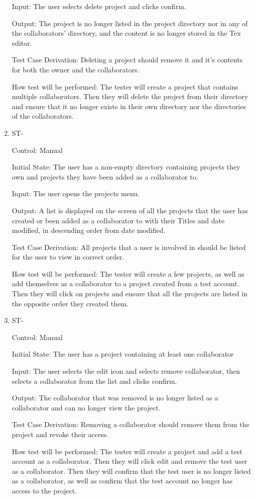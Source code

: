 \documentclass[12pt, titlepage]{article}
\newcounter{TESTID}
\newcommand\TESTNUM{\stepcounter{TESTID}\theTESTID}
\begin{document}
\begin{enumerate}
		Input: The user selects delete project and clicks confirm.
		
		Output: The project is no longer listed in the project directory nor in any of the collaborators' directory, and the content is no longer stored in the Tex editor.
		
		Test Case Derivation: Deleting a project should remove it and it's contents for both the owner and the collaborators.
		
		How test will be performed: The tester will create a project that contains multiple collaborators. Then they will delete the project from their directory and ensure that it no longer exists in their own directory nor the directories of the collaborators.
		
		\item{ST-\TESTNUM\\}
		
		Control: Manual
		
		Initial State: The user has a non-empty directory containing projects they own and projects they have been added as a collaborator to.
		
		Input: The user opens the projects menu. 
		
		Output: A list is displayed on the screen of all the projects that the user has created or been added as a collaborator to with their Titles and date modified, in descending order from date modified.
		
		Test Case Derivation: All projects that a user is involved in should be listed for the user to view in correct order.
		
		How test will be performed: The tester will create a few projects, as well as add themselves as a collaborator to a project created from a test account. Then they will click on projects and ensure that all the projects are listed in the opposite order they created them.
		
		\item{ST-\TESTNUM\\}
		
		Control: Manual
		
		Initial State: The user has a project containing at least one collaborator
		
		Input: The user selects the edit icon and selects remove collaborator, then selects a collaborator from the list and clicks confirm. 
		
		Output: The collaborator that was removed is no longer listed as a collaborator and can no longer view the project.
		
		Test Case Derivation: Removing a collaborator should remove them from the project and revoke their access.
		
		How test will be performed: The tester will create a project and add a test account as a collaborator. Then they will click edit and remove the test user as a collaborator. Then they will confirm that the test user is no longer listed as a collaborator, as well as confirm that the test account no longer has access to the project.
		
		
	\end{enumerate}
	
\end{document}

